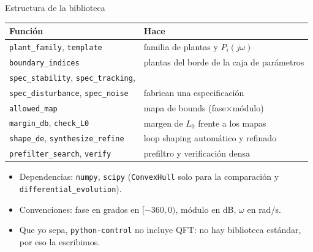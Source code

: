 \documentclass[aspectratio=169,11pt]{beamer}
\begin{document}
\begin{frame}{Estructura de la biblioteca}
  \small
  \begin{center}
  \begin{tabular}{l|l}
    Función & Hace\\\hline
    \texttt{plant\_family}, \texttt{template} & familia de plantas y $P_i(j\omega)$\\
    \texttt{boundary\_indices} & plantas del borde de la caja de parámetros\\
    \texttt{spec\_stability}, \texttt{spec\_tracking},\\\texttt{spec\_disturbance}, \texttt{spec\_noise} & fabrican una especificación\\
    \texttt{allowed\_map} & mapa de bounds (fase$\times$módulo)\\
    \texttt{margin\_db}, \texttt{check\_L0} & margen de $L_0$ frente a los mapas\\
    \texttt{shape\_de}, \texttt{synthesize\_refine} & loop shaping automático y refinado\\
    \texttt{prefilter\_search}, \texttt{verify} & prefiltro y verificación densa
  \end{tabular}
  \end{center}
  \footnotesize
  \begin{itemize}
    \item Dependencias: \texttt{numpy}, \texttt{scipy} (\texttt{ConvexHull} solo para la comparación y \texttt{differential\_evolution}).
    \item Convenciones: fase en grados en $[-360,0)$, módulo en dB, $\omega$ en rad/s.
    \item Que yo sepa, \texttt{python-control} no incluye QFT: no hay biblioteca estándar, por eso la escribimos.
  \end{itemize}
\end{frame}
\end{document}

